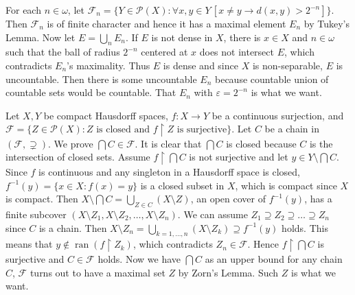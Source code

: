 \documentclass[12pt]{article}
\newcommand{\ran}{\mathop{\mathrm{ran}}}
\theoremstyle{definition}
\newenvironment{customthm}[1]
  {\renewcommand\theinnercustomthm{#1}\innercustomthm}
  {\endinnercustomthm}
\begin{document}
\begin{customthm}{I.12.14} For each $n\in\omega$, let $\mathcal{F}_n=\{Y\in\mathcal{P}(X):\forall x,y\in Y\,[x\neq y\rightarrow d(x,y)>2^{-n}]\}$. Then $\mathcal{F}_n$ is of finite character and hence it has a maximal element $E_n$ by Tukey's Lemma. Now let $E=\bigcup_n E_n$. If $E$ is not dense in $X$, there is $x\in X$ and $n\in\omega$ such that the ball of radius $2^{-n}$ centered at $x$ does not intersect $E$, which contradicts $E_n$'s maximality. Thus $E$ is dense and since $X$ is non-separable, $E$ is uncountable. Then there is some uncountable $E_n$ because countable union of countable sets would be countable. That $E_n$ with $\varepsilon=2^{-n}$ is what we want.
\end{customthm}

\begin{customthm}{I.12.16} Let $X,Y$ be compact Hausdorff spaces, $f:X\rightarrow Y$ be a continuous surjection, and $\mathcal{F}=\{Z\in\mathcal{P}(X):Z\text{ is closed and }f\upharpoonright Z\text{ is surjective}\}$. Let $C$ be a chain in $(\mathcal{F},\supsetneq)$. We prove $\bigcap C\in\mathcal{F}$. It is clear that $\bigcap C$ is closed because $C$ is the intersection of closed sets. Assume $f\upharpoonright\bigcap C$ is not surjective and let $y\in Y\setminus\bigcap C$. Since $f$ is continuous and any singleton in a Hausdorff space is closed, $f^{-1}(y)=\{x\in X:f(x)=y\}$ is a closed subset in $X$, which is compact since $X$ is compact. Then $X\setminus\bigcap C=\bigcup_{Z\in C}(X\setminus Z)$, an open cover of $f^{-1}(y)$, has a finite subcover $(X\setminus Z_1,X\setminus Z_2,\ldots,X\setminus Z_n)$. We can assume $Z_1\supseteq Z_2\supseteq\ldots\supseteq Z_n$ since $C$ is a chain. Then $X\setminus Z_n=\bigcup_{k=1,\ldots,n}(X\setminus Z_k)\supseteq f^{-1}(y)$ holds. This means that $y\not\in\ran(f\upharpoonright Z_k)$, which contradicts $Z_n\in\mathcal{F}$. Hence $f\upharpoonright\bigcap C$ is surjective and $C\in\mathcal{F}$ holds. Now we have $\bigcap C$ as an upper bound for any chain $C$, $\mathcal{F}$ turns out to have a maximal set $Z$ by Zorn's Lemma. Such $Z$ is what we want.
\end{customthm}
\end{document}
